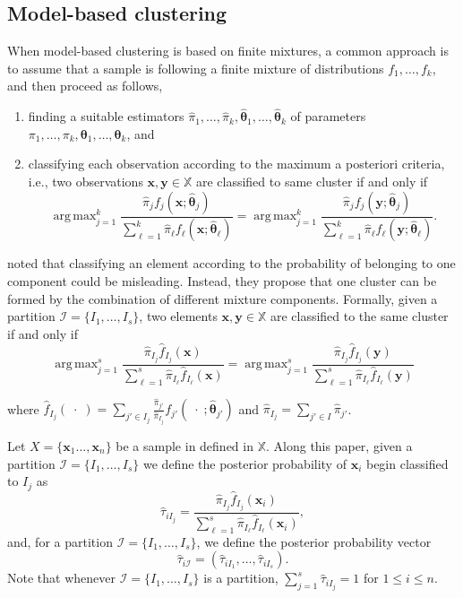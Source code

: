 \documentclass[10pt, a4paper]{article}
\DeclareMathOperator*{\argmax}{arg\,max}
\newcommand{\m}[1]{\boldsymbol{#1}}
\begin{document}
\subsection*{Model-based clustering}

When model-based clustering is based on finite mixtures, a common approach is to assume that a sample is following a finite mixture of distributions $f_1, \dots, f_k$, and then proceed as follows, 
\begin{enumerate}
\item finding a suitable estimators $\hat{\pi}_1, \dots, \hat{\pi}_k, \hat{\m\theta}_1, \dots, \hat{\m\theta}_k$ of parameters $\pi_1, \dots, \pi_k, \m\theta_1, \dots, \m\theta_k$, and
\item classifying each observation according to the maximum a posteriori criteria, i.e., two observations $\m x, \m y \in \mathbb{X}$ are classified to same cluster if and only if
\[
\argmax_{j=1}^k \frac{ \hat{\pi}_j f_j(\m x ; \hat{\m\theta}_j) }{\sum_{\ell=1}^k \hat{\pi}_\ell f_\ell(\m x ; \hat{\m\theta}_\ell) } = \argmax_{j=1}^k \frac{ \hat{\pi}_j f_j(\m y ; \hat{\m\theta}_j) }{ \sum_{\ell=1}^k \hat{\pi}_\ell f_\ell(\m y ; \hat{\m\theta}_\ell) }.
\]
\end{enumerate}


\cite{lee2004combining,hennig2010methods,baudry2010combining,melnykov2013distribution,pastore2013merging} noted that classifying an element according to the probability of belonging to one component could be misleading. Instead, they propose that one cluster can be formed by the combination of different mixture components. Formally, given a partition $\mathcal{I} = \{ I_1, \dots, I_s\}$, two elements $\m x, \m y \in \mathbb{X}$ are classified to the same cluster if and only if
\begin{equation}\label{cluster_criteria}
\argmax_{j=1}^s \frac{ \hat{\pi}_{I_j} \hat{f}_{I_j}(\m x) }{\sum_{\ell=1}^s \hat{\pi}_{I_\ell} \hat{f}_{I_\ell}(\m x ) } = \argmax_{j=1}^s \frac{ \hat{\pi}_{I_j} \hat{f}_{I_j}(\m y) }{ \sum_{\ell=1}^s \hat{\pi}_{I_\ell} \hat{f}_{I_\ell}(\m y) }
\end{equation}

where $\hat{f}_{I_j}(\; \cdot \;) = \sum_{j' \in I_j} \frac{\hat{\pi}_{j'}}{\hat{\pi}_{I_j}} f_{j'}(\; \cdot \; ; \hat{\m\theta}_{j'})$ and $\hat{\pi}_{I_j} =  \sum_{j' \in I} \hat{\pi}_{j'}$. 

Let $X = \{\m x_1\dots, \m x_n\}$ be a sample in defined in $\mathbb{X}$. Along this paper, given a partition $\mathcal{I} = \{ I_1, \dots, I_s \}$ we define the posterior probability  of $\m x_i$ begin classified to $I_j$ as
\[
\hat{\tau}_{i I_j} =  \frac{ \hat{\pi}_{I_j} \hat{f}_{I_j}(\m x_i) }{\sum_{\ell=1}^s \hat{\pi}_{I_\ell} \hat{f}_{I_\ell}(\m x_i)},
\]
and, for a partition  $\mathcal{I} = \{ I_1, \dots, I_s\}$, we define the posterior probability vector
\[
\hat{\tau}_{i \mathcal{I}} = \left( \hat{\tau}_{i I_1} , \dots, \hat{\tau}_{i I_s}  \right).
\]
Note that whenever  $\mathcal{I} = \{ I_1, \dots, I_s\}$ is a partition, $\sum_{j=1}^s \hat{\tau}_{i I_j} = 1$ for $1 \leq i \leq n$.
\end{document}
